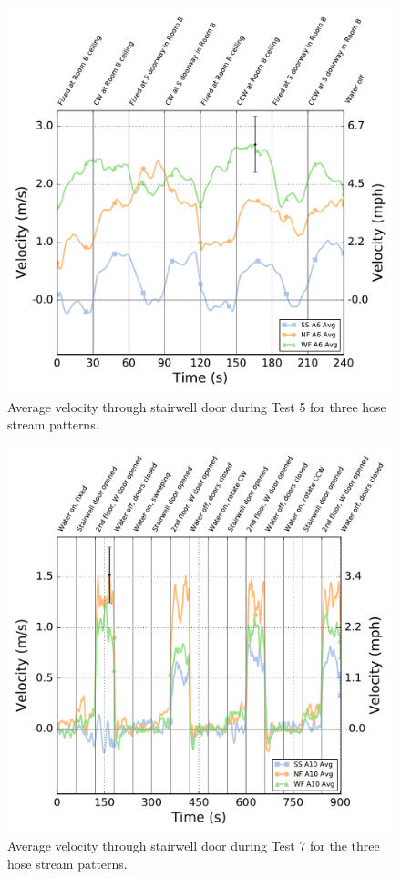 \documentclass[12pt,oneside]{book}
\begin{document}
\begin{figure}[!ht]
	\includegraphics[width=0.86\columnwidth]{../Figures/Plots/HOSE_IXAOXX_BDP_A6_stream_avgs}
	\caption{Average velocity through stairwell door during Test 5 for three hose stream patterns.}
	\label{fig:Test_5_BDP_A6_Avg_All}
\end{figure}
\FloatBarrier

\begin{figure}[!ht]
	\includegraphics[width=\columnwidth]{../Figures/Plots/Test_19_West_063014_BDP_A10_stream_avgs}
	\caption{Average velocity through stairwell door during Test 7 for the three hose stream patterns.}
	\label{fig:Test_7_BDP_A10_Avg_All}
\end{figure}

\clearpage
\end{document}
